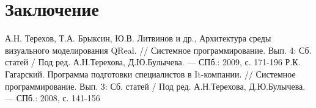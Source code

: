 \documentclass[a5paper]{article}
\begin{document}
\section*{Заключение}

\pagebreak

\begin{thebibliography}{9000}
   А.Н. Терехов, Т.А. Брыксин, Ю.В. Литвинов и др., Архитектура среды визуального моделирования QReal. // Системное 
программирование. Вып. 4: Сб. статей / Под ред. А.Н.Терехова, Д.Ю.Булычева. --- СПб.: 2009, с. 171-196
   Р.К. Гагарский. Программа подготовки специалистов в It-компании. // Системное 
программирование. Вып. 3: Сб. статей / Под ред. А.Н.Терехова, Д.Ю.Булычева. --- СПб.: 2008, с. 141-156
\end{thebibliography}
  
\end{document}
